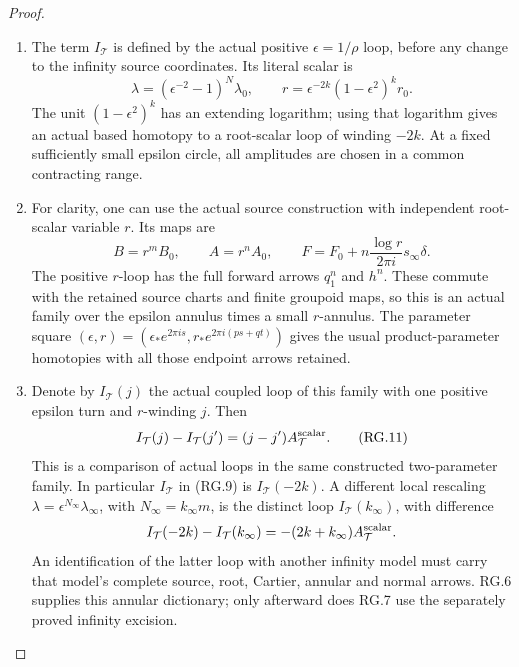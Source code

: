 \begin{proof}
\begin{enumerate}[label=\arabic*.]
\par

\medskip\noindent\textbf{RG.5. The infinity scalar path and the independent scalar parameter}

\par\nobreak

\item The term \(I_{\mathcal T}\) is defined by the actual positive
\(\epsilon=1/\rho\) loop, before any change to the infinity
source coordinates. Its literal scalar is
\[
 \lambda=(\epsilon^{-2}-1)^N\lambda_0,\qquad
 r=\epsilon^{-2k}(1-\epsilon^2)^k r_0.                \tag{RG.10}
\]
The unit \((1-\epsilon^2)^k\) has an extending logarithm;
using that logarithm gives an actual based homotopy to a
root-scalar loop of winding \(-2k\). At a fixed sufficiently
small epsilon circle, all amplitudes are chosen in a common
contracting range.

\item For clarity, one can use the actual source construction with
independent root-scalar variable \(r\). Its maps are
\[
 B=r^mB_0,\qquad A=r^nA_0,\qquad
 F=F_0+n\frac{\log r}{2\pi i}s_\infty\delta.
\]
The positive \(r\)-loop has the full forward arrows
\(q_1^n\) and \(h^n\). These commute with the retained source
charts and finite groupoid maps, so this is an actual family
over the epsilon annulus times a small \(r\)-annulus. The
parameter square \((\epsilon,r)=(\epsilon_*e^{2\pi is},
r_*e^{2\pi i(ps+qt)})\) gives the usual product-parameter
homotopies with all those endpoint arrows retained.

\item Denote by \(I_{\mathcal T}(j)\) the actual coupled loop of this
family with one positive epsilon turn and \(r\)-winding \(j\).
Then
\[
 I_{\mathcal T}(j)-I_{\mathcal T}(j')
       =(j-j')A^{\rm scalar}_{\mathcal T}.             \tag{RG.11}
\]
This is a comparison of actual loops in the same constructed
two-parameter family. In particular \(I_{\mathcal T}\) in
(RG.9) is \(I_{\mathcal T}(-2k)\). A different local rescaling
\(\lambda=\epsilon^{N_\infty}\lambda_\infty\), with
\(N_\infty=k_\infty m\), is the distinct loop
\(I_{\mathcal T}(k_\infty)\), with difference
\[
 I_{\mathcal T}(-2k)-I_{\mathcal T}(k_\infty)
       =-(2k+k_\infty)A^{\rm scalar}_{\mathcal T}.
\]
An identification of the latter loop with another infinity
model must carry that model's complete source, root,
Cartier, annular and normal arrows. RG.6 supplies this
annular dictionary; only afterward does RG.7 use the
separately proved infinity excision.


\end{enumerate}
\end{proof}
